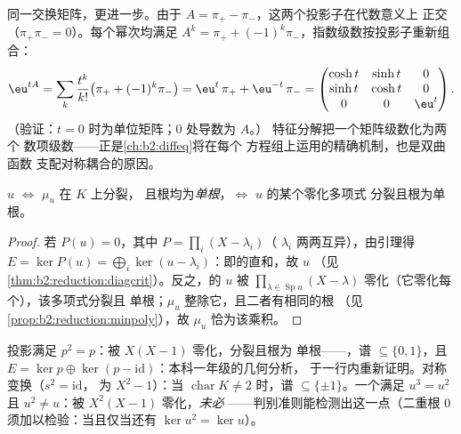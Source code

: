 \begin{example}[投影子同样可用来计算指数]\label{ex:b2:reduction:expprojectors}
同一交换矩阵，更进一步。由于 $A = \pi_+ -
\pi_-$，这两个投影子在代数意义上
正交（$\pi_+\pi_- = 0$）。每个幂次均满足 $A^k = \pi_+ +
(-1)^k\pi_-$，指数级数按投影子重新组合：
\[
\eu^{tA} = \sum_k \frac{t^k}{k!}\bigl(\pi_+ +
(-1)^k\pi_-\bigr)
= \eu^{t}\,\pi_+ + \eu^{-t}\,\pi_- =
\begin{pmatrix}
\cosh t & \sinh t & 0\\
\sinh t & \cosh t & 0\\
0 & 0 & \eu^{t}
\end{pmatrix}.
\]
（验证：$t = 0$ 时为单位矩阵；$0$ 处导数为 $A$。）
特征分解把一个矩阵级数化为两个
数项级数——正是\cref{ch:b2:diffeq}将在每个
方程组上运用的精确机制，也是双曲函数
支配对称耦合的原因。
\end{example}

\begin{corollary}[借助极小多项式判定可对角化]\label{cor:b2:reduction:minpolycrit}
$u$  $\iff$ $\mu_u$ 在 $K$ 上分裂，
且根均为\emph{单根}，$\iff$ $u$ 的某个零化多项式
分裂且根为单根。
\end{corollary}

\begin{proof}
若 $P(u) = 0$，其中 $P = \prod_{i}(X - \lambda_i)$（
$\lambda_i$ 两两互异），由引理得 $E = \ker P(u) = \bigoplus_i \ker(u -
\lambda_i)$：即的直和，故 $u$ 
（见\cref{thm:b2:reduction:diagcrit}）。反之，的
$u$ 被 $\prod_{\lambda \in \operatorname{Sp}u}(X -
\lambda)$ 零化（它零化每个），该多项式分裂且
单根；$\mu_u$ 整除它，且二者有相同的根
（见\cref{prop:b2:reduction:minpoly}），故 $\mu_u$ 恰为该乘积。
\end{proof}

\begin{example}\label{ex:b2:reduction:projections}
投影满足 $p^2 = p$：被 $X(X-1)$ 零化，分裂且根为
单根——，谱 $\subseteq \{0, 1\}$，且 $E =
\ker p \oplus \ker(p - \mathrm{id})$：本科一年级的几何分析，
于一行内重新证明。对称变换（$s^2 = \mathrm{id}$，
为 $X^2 - 1$）：当 $\operatorname{char} K
\neq 2$ 时，谱 $\subseteq \{\pm 1\}$。一个满足 $u^3 =
u^2$ 且 $u^2 \neq u$：被 $X^2(X - 1)$ 零化，\emph{未必}
——判别准则能检测出这一点（二重根
$0$ 须加以检验：当且仅当还有 $\ker u^2 = \ker
u$）。
\end{example}

